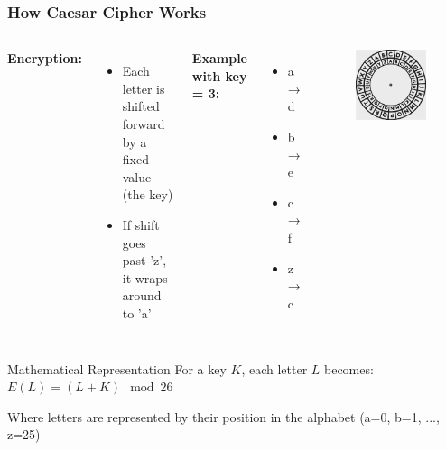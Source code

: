 \documentclass{beamer}
\begin{document}
\begin{frame}
    \frametitle{How Caesar Cipher Works}
    \begin{columns}
    \textbf{Encryption:}
    \begin{itemize}
        \item Each letter is shifted forward by a fixed value (the key)
        \item If shift goes past 'z', it wraps around to 'a'
    \end{itemize}
    
    \textbf{Example with key = 3:}
    \begin{itemize}
        \item a → d
        \item b → e
        \item c → f
        \item z → c
    \end{itemize}
    
    \begin{figure}
        \centering
        \includegraphics[width=0.75\linewidth]{th-3125735322.jpg}
    \end{figure}
    \end{columns}
    
    \begin{block}{Mathematical Representation}
        For a key $K$, each letter $L$ becomes:
        $E(L) = (L + K) \mod 26$
        
        Where letters are represented by their position in the alphabet (a=0, b=1, ..., z=25)
    \end{block}
\end{frame}
\end{document}
